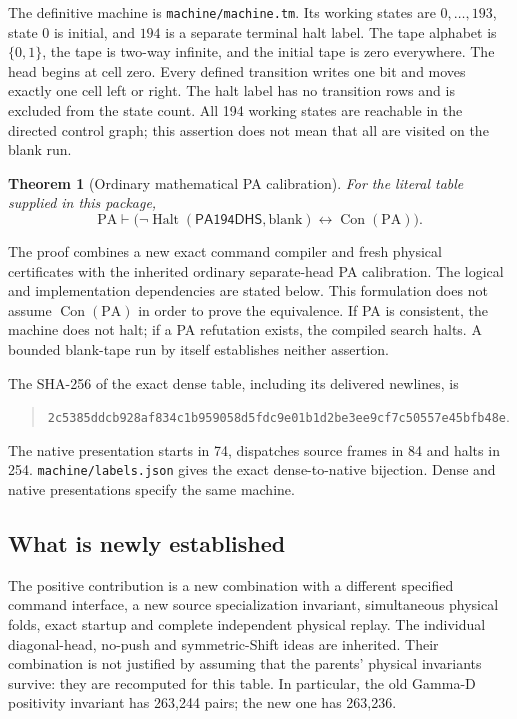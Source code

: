 \documentclass[11pt,letterpaper]{article}
\newcommand{\PA}{\mathrm{PA}}
\newcommand{\Con}{\operatorname{Con}}
\newcommand{\Halt}{\operatorname{Halt}}
\newcommand{\file}[1]{\texttt{\nolinkurl{#1}}}
\newtheorem{theorem}{Theorem}[section]
\begin{document}
The definitive machine is \file{machine/machine.tm}. Its working states
are $0,\ldots,193$, state $0$ is initial, and $194$ is a separate terminal
halt label. The tape alphabet is $\{0,1\}$, the tape is two-way infinite,
and the initial tape is zero everywhere. The head begins at cell zero.
Every defined transition writes one bit and moves exactly one cell left
or right. The halt label has no transition rows and is excluded from the
state count. All 194 working states are reachable in the directed control
graph; this assertion does not mean that all are visited on the blank run.

\begin{theorem}[Ordinary mathematical PA calibration]
For the literal table supplied in this package,
\[
 \boxed{\displaystyle
 \PA\vdash\bigl(\neg\Halt(\mathsf{PA194DHS},\mathrm{blank})
                 \longleftrightarrow\Con(\PA)\bigr).}
\]
\end{theorem}
The proof combines a new exact command compiler and fresh physical
certificates with the inherited ordinary separate-head PA calibration.
The logical and implementation dependencies are stated below. This
formulation does not assume $\Con(\PA)$ in order to prove the equivalence.
If PA is consistent, the machine does not halt; if a PA refutation exists,
the compiled search halts. A bounded blank-tape run by itself establishes
neither assertion.

The SHA-256 of the exact dense table, including its delivered newlines, is
\begin{quote}\small
\nolinkurl{2c5385ddcb928af834c1b959058d5fdc9e01b1d2be3ee9cf7c50557e45bfb48e}.
\end{quote}
The native presentation starts in 74, dispatches source frames in 84 and
halts in 254. \file{machine/labels.json} gives the exact dense-to-native
bijection. Dense and native presentations specify the same machine.

\subsection{What is newly established}

The positive contribution is a new combination with a different specified
command interface, a new source specialization invariant, simultaneous
physical folds, exact startup and complete independent physical replay.
The individual diagonal-head, no-push and symmetric-Shift ideas are inherited.
Their combination is not justified by assuming that the parents' physical
invariants survive: they are recomputed for this table. In particular, the
old Gamma-D positivity invariant has 263,244 pairs; the new one has 263,236.
\end{document}
